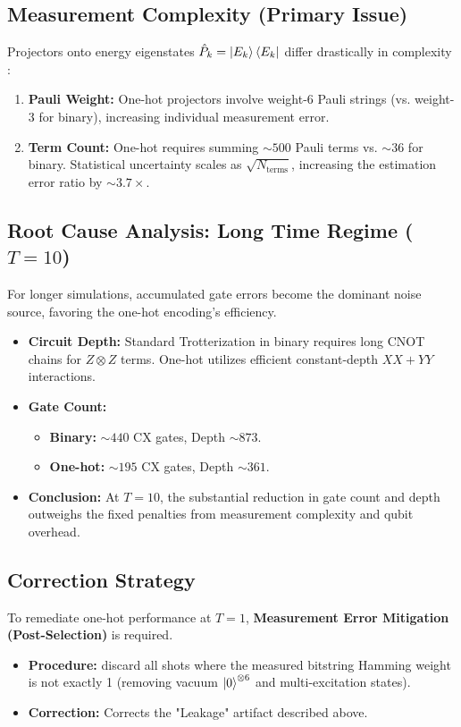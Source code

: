 \documentclass[%
nofootinbib,
 amsmath,amssymb,
 aps,
 prd,
10pt]{revtex4-2}
\begin{document}
\subsection{Measurement Complexity (Primary Issue)}
Projectors onto energy eigenstates $\hat{P}_k = \ket{E_k}\bra{E_k}$ differ drastically in complexity :
\begin{enumerate}
    \item \textbf{Pauli Weight:} One-hot projectors involve weight-6 Pauli strings (vs. weight-3 for binary), increasing individual measurement error.
    \item \textbf{Term Count:} One-hot requires summing $\sim 500$ Pauli terms vs. $\sim 36$ for binary. Statistical uncertainty scales as $\sqrt{N_{\text{terms}}}$, increasing the estimation error ratio by $\sim 3.7\times$.
\end{enumerate}

\subsection{Root Cause Analysis: Long Time Regime ($T=10$)}
For longer simulations, accumulated gate errors become the dominant noise source, favoring the one-hot encoding's efficiency.

\begin{itemize}
    \item \textbf{Circuit Depth:} Standard Trotterization in binary requires long CNOT chains for $Z\otimes Z$ terms. One-hot utilizes efficient constant-depth $XX+YY$ interactions.
    \item \textbf{Gate Count:} 
    \begin{itemize}
        \item \textbf{Binary:} $\sim 440$ CX gates, Depth $\sim 873$.
        \item \textbf{One-hot:} $\sim 195$ CX gates, Depth $\sim 361$.
    \end{itemize}
    \item \textbf{Conclusion:} At $T=10$, the substantial reduction in gate count and depth outweighs the fixed penalties from measurement complexity and qubit overhead.
\end{itemize}

\subsection{Correction Strategy}
To remediate one-hot performance at $T=1$, \textbf{Measurement Error Mitigation (Post-Selection)} is required.
\begin{itemize}
    \item \textbf{Procedure:} discard all shots where the measured bitstring Hamming weight is not exactly 1 (removing vacuum $\ket{0}^{\otimes 6}$ and multi-excitation states).
    \item \textbf{Correction:} Corrects the "Leakage" artifact described above.
\end{itemize}


\end{document}

